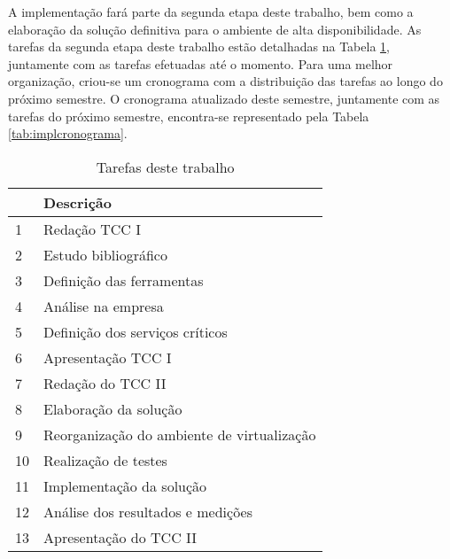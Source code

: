 A implementação fará parte da segunda etapa deste trabalho, bem como a elaboração da solução definitiva para o ambiente de alta disponibilidade. 
As tarefas da segunda etapa deste trabalho estão detalhadas na Tabela \ref{tab:impltarefas}, juntamente com as tarefas efetuadas até o momento. 
Para uma melhor organização, criou-se um cronograma com a distribuição das tarefas ao longo do próximo semestre. O cronograma atualizado 
deste semestre, juntamente com as tarefas do próximo semestre, encontra-se representado pela Tabela \ref{tab:implcronograma}.

\begin{table}[h!]\normalsize
\caption {Tarefas deste trabalho}
\label{tab:impltarefas}
\begin{center}
\begin{tabular}{|l|l|}\hline
 & \textbf{Descrição} \\\hline
1 & Redação TCC I \\\hline
2 & Estudo bibliográfico \\\hline
3 & Definição das ferramentas \\\hline
4 & Análise na empresa \\\hline
5 & Definição dos serviços críticos \\\hline
6 & Apresentação TCC I \\\hline
7 & Redação do TCC II \\\hline
8 & Elaboração da solução \\\hline
9 & Reorganização do ambiente de virtualização \\\hline
10 & Realização de testes \\\hline
11 & Implementação da solução \\\hline
12 & Análise dos resultados e medições \\\hline
13 & Apresentação do TCC II \\\hline
\end{tabular}
\end{center}
\end{table}

